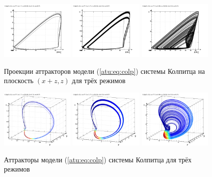\begin{figure}[htb!]
 \centerline{
   \includegraphics[width=0.32\textwidth]{p/mod/colp_0-p_z_xpz_b=1x70.png}
   \includegraphics[width=0.32\textwidth]{p/mod/colp_0-p_z_xpz_b=1x37.png}
   \includegraphics[width=0.32\textwidth]{p/mod/colp_0-p_z_xpz_b=0x99.png}
 }
  \caption{Проекции аттракторов модели (\ref{atu:eq:colp}) системы Колпитца на плоскость $(x+z,z)$
  для трёх режимов}
  \label{atu:f:colp_model_xzz}
\end{figure}


\begin{figure}[htb!]
 \centerline{
   \includegraphics[width=0.32\textwidth]{p/mod/colp_0-p_xyz_b=1x70.png}
   \includegraphics[width=0.32\textwidth]{p/mod/colp_0-p_xyz_b=1x37.png}
   \includegraphics[width=0.32\textwidth]{p/mod/colp_0-p_xyz_b=0x99.png}
 }
  \caption{Аттракторы модели (\ref{atu:eq:colp}) системы Колпитца для трёх режимов}
  \label{atu:f:colp_model_xyz}
\end{figure}

